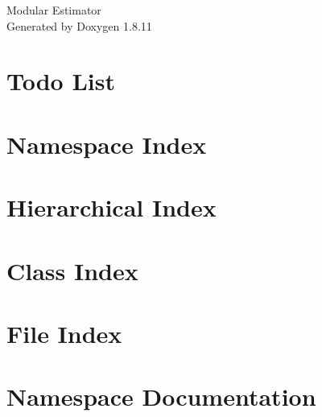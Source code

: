 \documentclass[twoside]{book}
\newcommand{\+}{\discretionary{\mbox{\scriptsize$\hookleftarrow$}}{}{}}
\newcommand{\clearemptydoublepage}{%
  \newpage{\pagestyle{empty}\cleardoublepage}%
}
\begin{document}
\hypersetup{pageanchor=false,
             bookmarksnumbered=true,
             pdfencoding=unicode
            }
\begin{titlepage}
\vspace*{7cm}
\begin{center}%
{\Large Modular Estimator }\\
\vspace*{1cm}
{\large Generated by Doxygen 1.8.11}\\
\end{center}
\end{titlepage}
\clearemptydoublepage
\tableofcontents
\clearemptydoublepage
{}
\hypersetup{pageanchor=true}

\chapter{Todo List}
\label{todo}
\hypertarget{todo}{}

\chapter{Namespace Index}

\chapter{Hierarchical Index}

\chapter{Class Index}

\chapter{File Index}

\chapter{Namespace Documentation}













\end{document}
